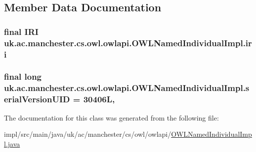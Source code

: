 \subsection{Member Data Documentation}
\hypertarget{classuk_1_1ac_1_1manchester_1_1cs_1_1owl_1_1owlapi_1_1_o_w_l_named_individual_impl_a8b3dad50b45ec458da0e500409882f84}{
\subsubsection[{iri}]{\setlength{\rightskip}{0pt plus 5cm}final {\bf I\-R\-I} uk.\-ac.\-manchester.\-cs.\-owl.\-owlapi.\-O\-W\-L\-Named\-Individual\-Impl.\-iri\hspace{0.3cm}{\ttfamily [private]}}}\label{classuk_1_1ac_1_1manchester_1_1cs_1_1owl_1_1owlapi_1_1_o_w_l_named_individual_impl_a8b3dad50b45ec458da0e500409882f84}
\hypertarget{classuk_1_1ac_1_1manchester_1_1cs_1_1owl_1_1owlapi_1_1_o_w_l_named_individual_impl_a0e07d57646a776830cba0f2f09784478}{
\subsubsection[{serial\-Version\-U\-I\-D}]{\setlength{\rightskip}{0pt plus 5cm}final long uk.\-ac.\-manchester.\-cs.\-owl.\-owlapi.\-O\-W\-L\-Named\-Individual\-Impl.\-serial\-Version\-U\-I\-D = 30406\-L\hspace{0.3cm}{\ttfamily [static]}, {\ttfamily [private]}}}\label{classuk_1_1ac_1_1manchester_1_1cs_1_1owl_1_1owlapi_1_1_o_w_l_named_individual_impl_a0e07d57646a776830cba0f2f09784478}


The documentation for this class was generated from the following file\-:\begin{DoxyCompactItemize}
\item 
impl/src/main/java/uk/ac/manchester/cs/owl/owlapi/\hyperlink{_o_w_l_named_individual_impl_8java}{O\-W\-L\-Named\-Individual\-Impl.\-java}\end{DoxyCompactItemize}
